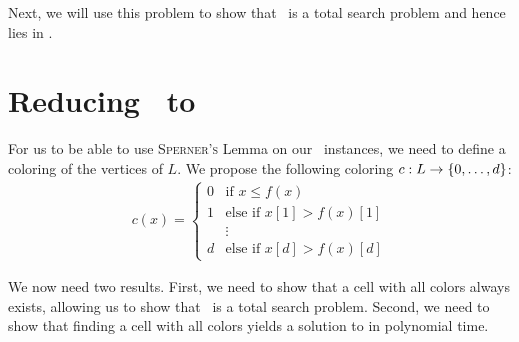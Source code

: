 
Next, we will use this problem to show that \Tarskistar\ is a total search problem and hence lies in \PPAD.

\section{Reducing \Tarskistar\ to \Sperner}
\label{sec:tarskistar_to_sperner}

For us to be able to use \textsc{Sperner's} Lemma on our \Tarskistar\ instances, we need to define a coloring of the vertices of $L$. We propose the following coloring $c : L \rightarrow \left\{0, \dots, d\right\}$:
\begin{align*}
    c(x) =
    \begin{cases}
        0 & \text{if $x \leq f(x)$}         \\
        1 & \text{else if $x[1] > f(x)[1]$} \\
          & \vdots                          \\
        d & \text{else if $x[d] > f(x)[d]$}
    \end{cases}
\end{align*}

We now need two results. First, we need to show that a cell with all colors always exists, allowing us to show that \Tarskistar\ is a total search problem. Second, we need to show that finding a cell with all colors yields a solution to \Tarskistar in polynomial time.

